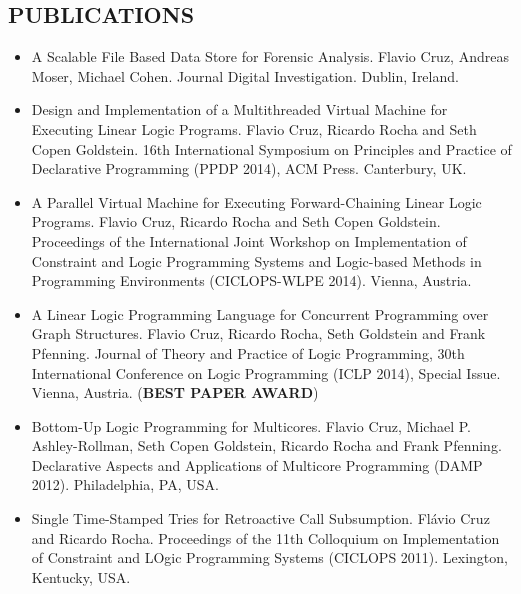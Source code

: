 \documentclass[margin]{res}
\begin{document}
\begin{resume}
\section{PUBLICATIONS}
   \begin{itemize}
      \item A Scalable File Based Data Store for Forensic Analysis. Flavio Cruz, Andreas Moser, Michael Cohen. Journal Digital Investigation. Dublin, Ireland.
      \item Design and Implementation of a Multithreaded Virtual Machine for Executing Linear Logic Programs. Flavio Cruz, Ricardo Rocha and Seth Copen Goldstein. 16th International Symposium on Principles and Practice of Declarative Programming (PPDP 2014), ACM Press. Canterbury, UK.
      \item A Parallel Virtual Machine for Executing Forward-Chaining Linear Logic Programs. Flavio Cruz, Ricardo Rocha and Seth Copen Goldstein. Proceedings of the International Joint Workshop on Implementation of Constraint and Logic Programming Systems and Logic-based Methods in Programming Environments (CICLOPS-WLPE 2014). Vienna, Austria.
      \item A Linear Logic Programming Language for Concurrent Programming over Graph Structures. Flavio Cruz, Ricardo Rocha, Seth Goldstein and Frank Pfenning. Journal of Theory and Practice of Logic Programming, 30th International Conference on Logic Programming (ICLP 2014), Special Issue. Vienna, Austria. (\textbf{BEST PAPER AWARD})
      \item Bottom-Up Logic Programming for Multicores. Flavio Cruz, Michael P. Ashley-Rollman, Seth Copen Goldstein, Ricardo Rocha and Frank Pfenning. Declarative Aspects and Applications of Multicore Programming (DAMP 2012). Philadelphia, PA, USA.
      \item Single Time-Stamped Tries for Retroactive Call Subsumption. Flávio Cruz and Ricardo Rocha. Proceedings of the 11th Colloquium on Implementation of Constraint and LOgic Programming Systems (CICLOPS 2011). Lexington, Kentucky, USA.
\end{itemize}
\pagebreak

\end{resume}
\end{document}
